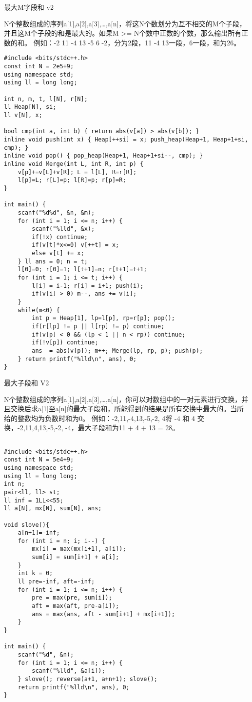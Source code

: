 最大M字段和 v2

N个整数组成的序列a[1],a[2],a[3],…,a[n]，将这N个数划分为互不相交的M个子段，并且这M个子段的和是最大的。如果M >= N个数中正数的个数，那么输出所有正数的和。
例如：-2 11 -4 13 -5 6 -2，分为2段，11 -4 13一段，6一段，和为26。

\begin{lstlisting}
#include <bits/stdc++.h>
const int N = 2e5+9;
using namespace std;
using ll = long long;

int n, m, t, l[N], r[N];
ll Heap[N], si;
ll v[N], x;

bool cmp(int a, int b) { return abs(v[a]) > abs(v[b]); }
inline void push(int x) { Heap[++si] = x; push_heap(Heap+1, Heap+1+si, cmp); }
inline void pop() { pop_heap(Heap+1, Heap+1+si--, cmp); }
inline void Merge(int L, int R, int p) {
    v[p]+=v[L]+v[R]; L = l[L], R=r[R];
    l[p]=L; r[L]=p; l[R]=p; r[p]=R;
}

int main() {
    scanf("%d%d", &n, &m);
    for (int i = 1; i <= n; i++) {
        scanf("%lld", &x);
        if(!x) continue;
        if(v[t]*x<=0) v[++t] = x;
        else v[t] += x;
    } ll ans = 0; n = t;
    l[0]=0; r[0]=1; l[t+1]=n; r[t+1]=t+1;
    for (int i = 1; i <= t; i++) {
        l[i] = i-1; r[i] = i+1; push(i);
        if(v[i] > 0) m--, ans += v[i];
    }
    while(m<0) {
        int p = Heap[1], lp=l[p], rp=r[p]; pop();
        if(r[lp] != p || l[rp] != p) continue;
        if(v[p] < 0 && (lp < 1 || n < rp)) continue;
        if(!v[p]) continue;
        ans -= abs(v[p]); m++; Merge(lp, rp, p); push(p);
    } return printf("%lld\n", ans), 0;
}
\end{lstlisting}

最大子段和 V2

N个整数组成的序列a[1],a[2],a[3],…,a[n]，你可以对数组中的一对元素进行交换，并且交换后求a[1]至a[n]的最大子段和，所能得到的结果是所有交换中最大的。当所给的整数均为负数时和为0。
例如：{-2,11,-4,13,-5,-2, 4}将 -4 和 4 交换，{-2,11,4,13,-5,-2, -4}，最大子段和为11 + 4 + 13 = 28。

\begin{lstlisting}

#include <bits/stdc++.h>
const int N = 5e4+9;
using namespace std;
using ll = long long;
int n;
pair<ll, ll> st;
ll inf = 1LL<<55;
ll a[N], mx[N], sum[N], ans;

void slove(){
    a[n+1]=-inf;
    for (int i = n; i; i--) {
        mx[i] = max(mx[i+1], a[i]);
        sum[i] = sum[i+1] + a[i];
    }
    int k = 0;
    ll pre=-inf, aft=-inf;
    for (int i = 1; i <= n; i++) {
        pre = max(pre, sum[i]);
        aft = max(aft, pre-a[i]);
        ans = max(ans, aft - sum[i+1] + mx[i+1]);
    }
}

int main() {
    scanf("%d", &n);
    for (int i = 1; i <= n; i++) {
        scanf("%lld", &a[i]);
    } slove(); reverse(a+1, a+n+1); slove();
    return printf("%lld\n", ans), 0;
}

\end{lstlisting}

